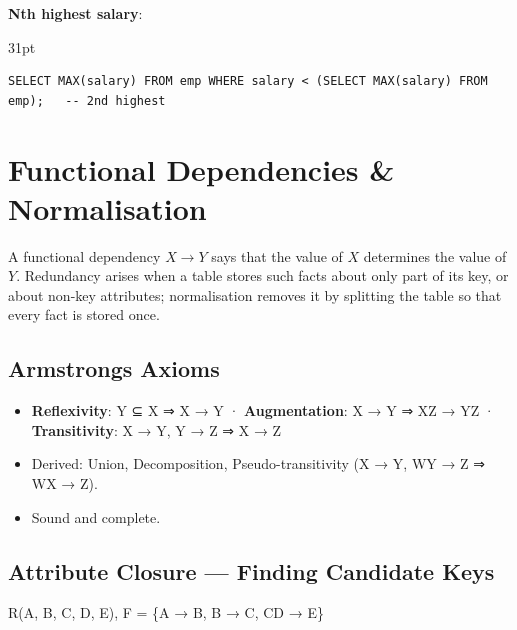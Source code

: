 \textbf{Nth highest salary}:

\begin{listingblock}{31pt}
\begin{Verbatim}[fontsize=\fontsize{9.0}{10.9}\selectfont]
SELECT MAX(salary) FROM emp WHERE salary < (SELECT MAX(salary) FROM emp);   -- 2nd highest
\end{Verbatim}
\end{listingblock}

\needspace{161pt}

\hypertarget{p2-04--6-functional-dependencies--normalisation}{%
\section{Functional Dependencies \& Normalisation}\label{p2-04--6-functional-dependencies--normalisation}}

A functional dependency \(X \to Y\) says that the value of \(X\) determines the value of \(Y\). Redundancy arises
when a table stores such facts about only part of its key, or about non-key attributes; normalisation
removes it by splitting the table so that every fact is stored once.

\needspace{95pt}

\hypertarget{p2-04--61-armstrongs-axioms}{%
\subsection{Armstrong\textquotesingle s Axioms}\label{p2-04--61-armstrongs-axioms}}

\begin{itemize}
\tightlist
\item
  \textbf{Reflexivity}: Y ⊆ X ⇒ X → Y · \textbf{Augmentation}: X → Y ⇒ XZ → YZ · \textbf{Transitivity}: X → Y, Y → Z ⇒ X → Z
\item
  Derived: Union, Decomposition, Pseudo-transitivity (X → Y, WY → Z ⇒ WX → Z).
\item
  Sound and complete.
\end{itemize}

\needspace{125pt}

\hypertarget{p2-04--62-attribute-closure--finding-candidate-keys}{%
\subsection{Attribute Closure --- Finding Candidate Keys}\label{p2-04--62-attribute-closure--finding-candidate-keys}}

R(A, B, C, D, E), F = \{A → B, B → C, CD → E\}

